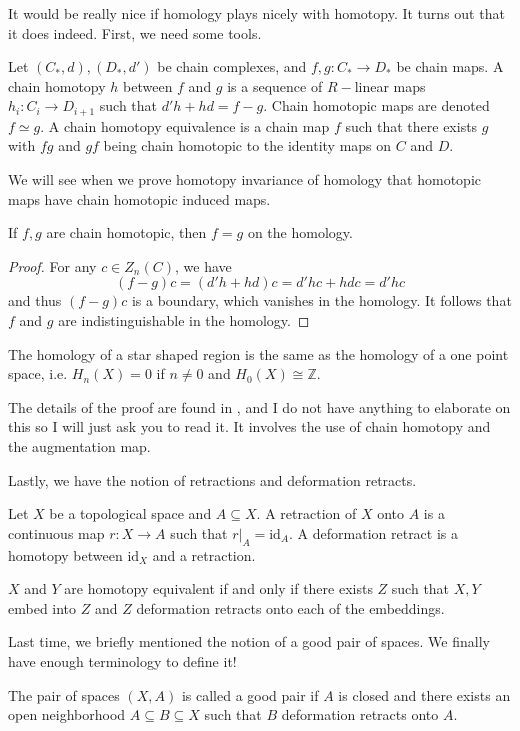 \documentclass[12pt,reqno]{amsart}
\numberwithin{theorem}{section}
\theoremstyle{definition}
\theoremstyle{remark}
\numberwithin{equation}{section}
\newcommand{\Z}{\mathbb Z}
\theoremstyle{definition}
\newcommand{\id}{\mathrm{id}}
\begin{document}
It would be really nice if homology plays nicely with homotopy. It turns out that it does indeed. First, we need some tools.
\begin{definition}
    Let $(C_*,d),(D_*,d')$ be chain complexes, and $f,g:C_*\rightarrow D_*$ be chain maps. A chain homotopy $h$ between $f$ and $g$ is a sequence of $R-$linear maps $h_i:C_i \rightarrow D_{i+1}$ such that $d'h+hd = f-g$. Chain homotopic maps are denoted $f\simeq g$. A chain homotopy equivalence is a chain map $f$ such that there exists $g$ with $fg $ and $gf$ being chain homotopic to the identity maps on $C$ and $D$.
\end{definition}
We will see when we prove homotopy invariance of homology that homotopic maps have chain homotopic induced maps.
\begin{proposition}
    If $f,g$ are chain homotopic, then $f=g$ on the homology.
\end{proposition}
\begin{proof}
    For any $c \in Z_n(C)$, we have $$(f-g)c = (d'h+hd)c = d'hc + hdc = d'hc$$
    and thus $(f-g)c$ is a boundary, which vanishes in the homology. It follows that $f$ and $g$ are indistinguishable in the homology.
\end{proof}
\begin{theorem}
    The homology of a star shaped region is the same as the homology of a one point space, i.e. $H_n(X) = 0$ if $n \neq 0$ and $H_0(X) \cong \Z$.
\end{theorem}
The details of the proof are found in \cite{miller}, and I do not have anything to elaborate on this so I will just ask you to read it. It involves the use of chain homotopy and the augmentation map.

Lastly, we have the notion of retractions and deformation retracts.
\begin{definition}
    Let $X$ be a topological space and $A\subseteq X$. A retraction of $X$ onto $A$ is a continuous map $r:X\rightarrow A$ such that $r|_A = \id_A$. A deformation retract is a homotopy between $\id_X$ and a retraction.
\end{definition}
\begin{proposition}
    $X$ and $Y$ are homotopy equivalent if and only if there exists $Z$ such that $X,Y$ embed into $Z$ and $Z$ deformation retracts onto each of the embeddings.
\end{proposition}
Last time, we briefly mentioned the notion of a good pair of spaces. We finally have enough terminology to define it!
\begin{definition}
    The pair of spaces $(X,A)$ is called a good pair if $A$ is closed and there exists an open neighborhood $A \subseteq B \subseteq X$ such that $B$ deformation retracts onto $A$.
\end{definition}
\end{document}
